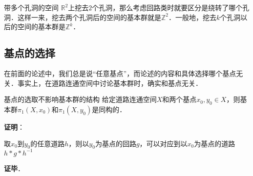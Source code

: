 \begin{example}{带多个孔洞的空间}
$\mathbb{R}^2$上挖去$2$个孔洞，那么考虑回路类时就要区分是绕转了哪个孔洞．这样一来，挖去两个孔洞后的空间的基本群就是$\mathbb{Z}^2$．一般地，挖去$k$个孔洞以后的空间的基本群是$\mathbb{Z}^k$．
\end{example}

\subsection{基点的选择}

在前面的论述中，我们总是说“任意基点”，而论述的内容和具体选择哪个基点无关．事实上，在道路连通空间中讨论基本群时，确实和基点无关．

\begin{theorem}{基点的选取不影响基本群的结构}
给定道路连通空间$X$和两个基点$x_0, y_0\in X$，则基本群$\pi_1(X, x_0)$和$\pi_1(X, y_0)$是同构的．
\end{theorem}

\textbf{证明}：

取$x_0$到$y_0$的任意道路$h$，则以$y_0$为基点的回路$g$，可以对应到以$x_0$为基点的道路$h*g*h^{-1}$

\textbf{证毕}．



